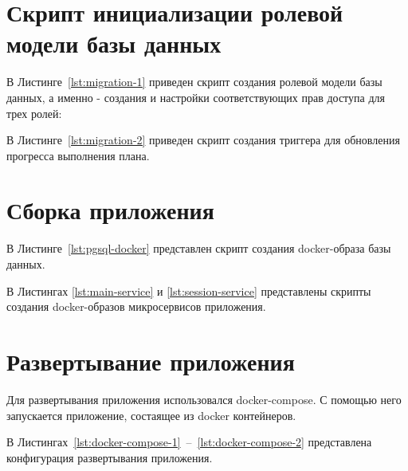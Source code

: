 \begin{appendices}
    \chapter{Скрипт инициализации ролевой модели базы данных}

	В Листинге~\ref{lst:migration-1} приведен скрипт создания ролевой модели базы данных, а именно - создания и настройки соответствующих прав доступа для трех ролей:

	\newpage
	
    В Листинге~\ref{lst:migration-2} приведен скрипт создания триггера для обновления прогресса выполнения плана.

	\newpage


	\chapter{Сборка приложения}

    В Листинге~\ref{lst:pgsql-docker} представлен скрипт создания docker-образа базы данных.


	 \newpage 
	 
 	В Листингах \ref{lst:main-service} и \ref{lst:session-service} представлены скрипты создания docker-образов микросервисов приложения.



	\chapter{Развертывание приложения}
	
	Для развертывания приложения использовался docker-compose. С помощью него запускается приложение, состаящее из docker контейнеров.
	
	 В Листингах~\ref{lst:docker-compose-1}~--~\ref{lst:docker-compose-2} представлена конфигурация развертывания приложения.
	 
	
	\newpage
	
\end{appendices}
